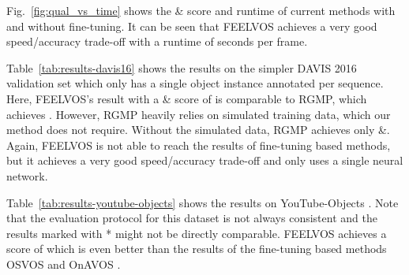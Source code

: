 \documentclass[10pt,twocolumn,letterpaper]{article}
\begin{document}
Fig.~\ref{fig:qual_vs_time} shows the \& score and runtime of current methods with and without fine-tuning. It can be seen that FEELVOS achieves a very good speed/accuracy trade-off with a runtime of  seconds per frame.

Table~\ref{tab:results-davis16} shows the results on the simpler DAVIS 2016 validation set which only has a single object instance annotated per sequence. Here, FEELVOS's result with a \& score of  is comparable to RGMP, which achieves . However, RGMP heavily relies on simulated training data, which our method does not require. Without the simulated data, RGMP achieves only  \&. Again, FEELVOS is not able to reach the results of fine-tuning based methods, but it achieves a very good speed/accuracy trade-off and only uses a single neural network.

Table~\ref{tab:results-youtube-objects} shows the results on YouTube-Objects \cite{YoutubeObjectsOriginal,YoutubeObjectsSegmentation}. Note that the evaluation protocol for this dataset is not always consistent and the results marked with * might not be directly comparable. FEELVOS achieves a  score of  which is even better than the results of the fine-tuning based methods OSVOS \cite{OSVOS} and OnAVOS \cite{voigtlaender17BMVC}.
\end{document}

